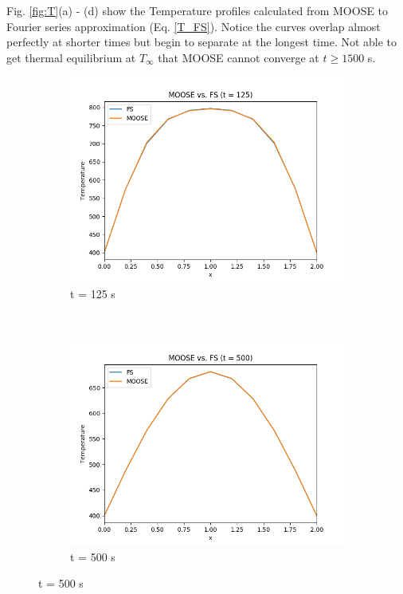 \documentclass[12pt]{article}
\begin{document}
Fig. \ref{fig:T}(a) - (d) show the Temperature profiles calculated from MOOSE to Fourier series approximation (Eq. \ref{T_FS}).  Notice the curves overlap almost perfectly at shorter times but begin to separate at the longest time. Not able to get thermal equilibrium at $T_{\infty}$ that MOOSE cannot converge at $t \geq 1500$ s.  
\begin{figure}[h]
    \centering
    \begin{subfigure}[b]{0.4\textwidth}
        \includegraphics[width=\textwidth]{t125.png}
        \caption{t = 125 s}
        \label{fig:t125}
    \end{subfigure}
    ~ %
    \begin{subfigure}[b]{0.4\textwidth}
        \includegraphics[width=\textwidth]{t500.png}
        \caption{t = 500 s}
        \label{fig:tiger}
    \end{subfigure}
    

\end{figure}
\end{document}
